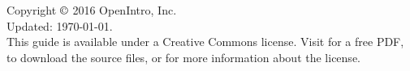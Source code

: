\chapter*{}
\vfill

\noindent Copyright $\copyright$ 2016 OpenIntro, Inc. \\
Updated: \today. \\

\noindent This guide is available under a Creative Commons license. %
Visit  for a free PDF, to download the source files, or for more information about the license. \\



